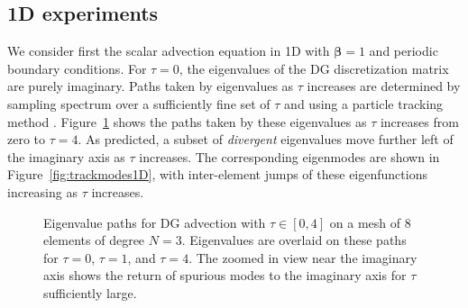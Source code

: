 \documentclass[preprint,10pt]{elsarticle}
\newcommand{\note}[1]{{\color{blue}#1}}
\begin{document}
\subsection{1D experiments}

We consider first the scalar advection equation in 1D with $\bm{\beta} = 1$ and periodic boundary conditions.  For $\tau = 0$, the eigenvalues of the DG discretization matrix are purely imaginary.  Paths taken by eigenvalues as $\tau$ increases are determined by sampling \note{spectrum} over a sufficiently fine set of $\tau$ and using a particle tracking method \cite{simpletracker}.  Figure~\ref{fig:track1D} shows the paths taken by these eigenvalues as $\tau$ increases from zero to $\tau = 4$.  As predicted, a subset of \emph{divergent} eigenvalues move further left of the imaginary axis as $\tau$ increases.  The corresponding eigenmodes are shown in Figure~\ref{fig:trackmodes1D}, with inter-element jumps of these eigenfunctions increasing as $\tau$ increases.  

\begin{figure}
\centering
{}
\hspace{1em}
\caption{Eigenvalue paths for DG advection with $\tau \in [0,4]$ on a mesh of 8 elements of degree $N=3$.  Eigenvalues are overlaid on these paths for $\tau = 0$, $\tau = 1$, and $\tau = 4$.  The zoomed in view near the imaginary axis shows the return of spurious modes to the imaginary axis for $\tau$ sufficiently large. }
\label{fig:track1D}
\end{figure}
\end{document}
